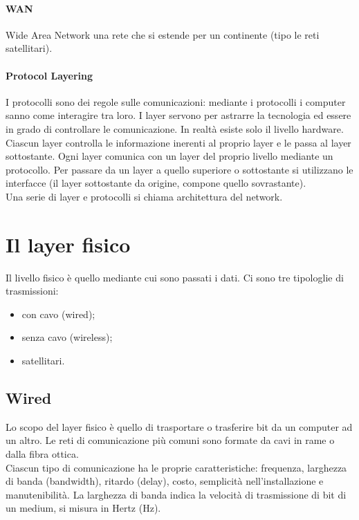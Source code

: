 \documentclass{article}
\begin{document}
\paragraph{WAN} Wide Area Network una rete che si estende per un continente (tipo
le reti satellitari).

\paragraph{Protocol Layering} I protocolli sono dei regole sulle comunicazioni:
mediante i protocolli i computer sanno come interagire tra loro.
I layer servono per astrarre la tecnologia ed essere in grado di controllare le
comunicazione. In realtà esiste solo il livello hardware. 
Ciascun layer controlla le informazione inerenti al proprio layer e le 
passa al layer sottostante. Ogni layer comunica con un layer del proprio
livello mediante un protocollo. Per passare da un layer a quello superiore o
sottostante si utilizzano le interfacce (il layer sottostante da origine,
compone quello sovrastante).\\
Una serie di layer e protocolli si chiama architettura del network. 

\section{Il layer fisico}
Il livello fisico è quello mediante cui sono passati i dati. Ci sono tre
tipologlie di trasmissioni: 
\begin{itemize}
	\item con cavo (wired);
	\item senza cavo (wireless);
	\item satellitari.
\end{itemize}

\subsection{Wired}
Lo scopo del layer fisico è quello di trasportare o trasferire bit da un
computer ad un altro. Le reti di comunicazione più comuni sono formate da cavi
in rame o dalla fibra ottica.\\
Ciascun tipo di comunicazione ha le proprie caratteristiche: frequenza, 
larghezza di banda (bandwidth), ritardo (delay), costo, semplicità 
nell'installazione e manutenibilità. La larghezza di banda indica la velocità 
di trasmissione di bit di un medium, si misura in Hertz (Hz).
\end{document}
